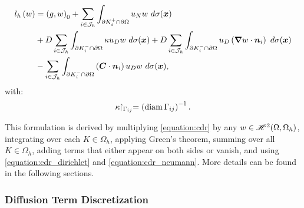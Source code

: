 \begin{align}
    l_h \left( w \right)  &= \left( g, w \right)_0 + \sum_{i \in \mathcal{J}_h} \int_{\partial K_i^+ \cap \partial \Omega} u_N w ~ d \sigma(\bm{x}) \label{equation:cdr_lh} \\
    &+ D \sum_{i \in \mathcal{J}_h} \int_{\partial K_i^- \cap \partial \Omega} \kappa u_D w ~ d \sigma(\bm{x}) + D \sum_{i \in \mathcal{J}_h} \int_{\partial K_i^- \cap \partial \Omega} u_D \left( \bm{\nabla} w \cdot \bm{n}_i \right) ~ d \sigma(\bm{x}) \notag \\
    &- \sum_{i \in \mathcal{J}_h} \int_{\partial K_i^- \cap \partial \Omega} \left( \bm{C} \cdot \bm{n}_i \right) u_D w ~ d \sigma(\bm{x}) \notag,
\end{align}
with:
\begin{align}
    \kappa \!\!\restriction_{\Gamma_{ij}} = \left( \operatorname*{diam} \Gamma_{ij} \right)^{-1}.
\end{align}

This formulation is derived by multiplying \cref{equation:cdr} by any $w \in \mathscr{H}^{2}(\Omega, \Omega_h)$, integrating over each $K \in \Omega_h$, applying Green's theorem, summing over all $K \in \Omega_h$, adding terms that either appear on both sides or vanish, and using \cref{equation:cdr_dirichlet} and \cref{equation:cdr_neumann}. More details can be found in the following sections.

\newpage
\subsubsection{Diffusion Term Discretization}


